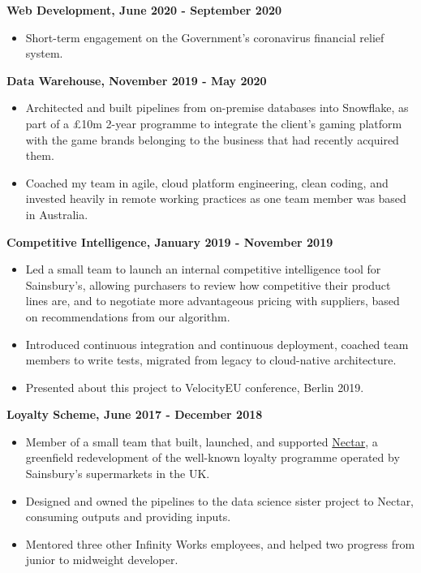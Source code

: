 \documentclass[a4paper,10pt]{article}
\begin{document}
\textbf{Web Development, June 2020 - September 2020}
\begin{itemize}
    \item Short-term engagement on the Government's coronavirus financial relief system.
\end{itemize}

\textbf{Data Warehouse, November 2019 - May 2020}
\begin{itemize}
    \item Architected and built pipelines from on-premise databases into Snowflake, as part of a £10m 2-year programme to integrate the client's gaming platform with the game brands belonging to the business that had recently acquired them.
    \item Coached my team in agile, cloud platform engineering, clean coding, and invested heavily in remote working practices as one team member was based in Australia.
\end{itemize}

\textbf{Competitive Intelligence, January 2019 - November 2019}
\begin{itemize}
    \item Led a small team to launch an internal competitive intelligence tool for Sainsbury's, allowing purchasers to review how competitive their product lines are, and to negotiate more advantageous pricing with suppliers, based on recommendations from our algorithm.
    \item Introduced continuous integration and continuous deployment, coached team members to write tests, migrated from legacy to cloud-native architecture.
    \item Presented about this project to VelocityEU conference, Berlin 2019.
\end{itemize}

\textbf{Loyalty Scheme, June 2017 - December 2018}
\begin{itemize}
    \item Member of a small team that built, launched, and supported \href{https://nectar.sainsburys.co.uk}{Nectar}, a greenfield redevelopment of the well-known loyalty programme operated by Sainsbury's supermarkets in the UK.
    \item Designed and owned the pipelines to the data science sister project to Nectar, consuming outputs and providing inputs.
    \item Mentored three other Infinity Works employees, and helped two progress from junior to midweight developer.
\end{itemize}
\end{document}
